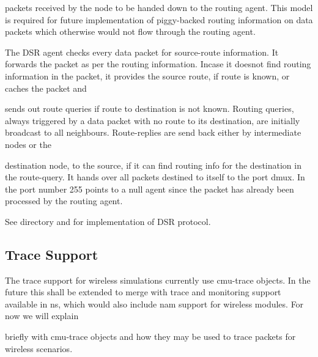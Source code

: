 packets received by the node to be handed down to the routing agent. This model is required for future implementation of piggy-backed routing information on data packets which otherwise would not flow through the routing agent.

The DSR agent checks every data packet for source-route information. It forwards the packet as per the routing information. Incase it doesnot find routing information in the packet, it provides the source route, if route is known, or caches the packet and











 sends out route queries if route to destination is not known. Routing queries, always triggered by a data packet with no route to its destination, are initially broadcast to all neighbours. Route-replies are send back either by intermediate nodes or the 











destination node, to the source, if it can find routing info for the destination in the route-query.  It hands over all packets destined to itself to the port dmux.
In  the port number 255 points to a null agent since the packet has already been processed by the routing agent.

See  directory and  for implementation of DSR protocol.


\subsection{Trace Support}
\label{sec:mobile-trace}

The trace support for wireless simulations currently use cmu-trace objects. In the future this shall be extended to merge with trace and monitoring support available in ns, which would also include nam support for wireless modules. For now we will explain











 briefly with cmu-trace objects and how they may be used to trace packets for wireless scenarios. 

